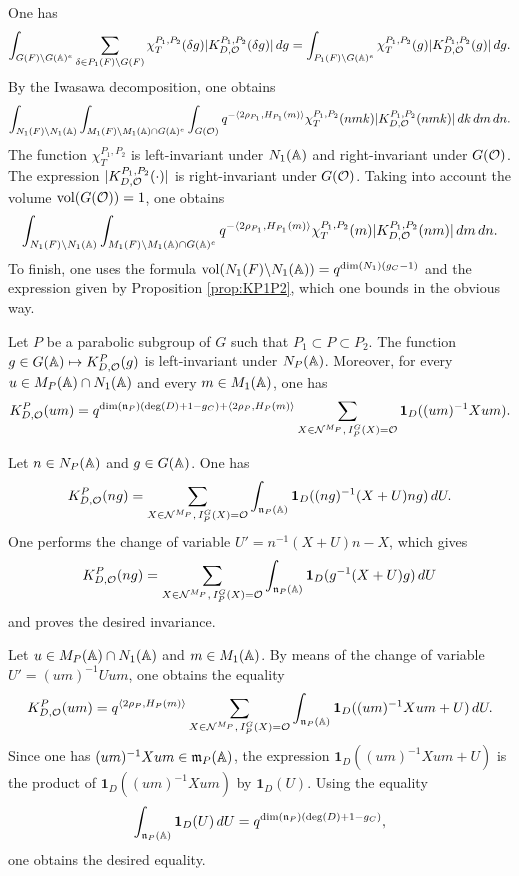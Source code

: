 \begin{paragr}
\begin{preuve}
  One has
$$\int_{G(F)\backslash G(\mathbb{A})^e} \sum_{\delta\in P_1(F)\backslash G(F)} \chi_T^{P_1,P_2}(\delta g)|K^{P_1,P_2}_{D,\mathcal{O}}(\delta g)|\, dg=\int_{P_1(F)\backslash G(\mathbb{A})^e} \chi_T^{P_1,P_2}(g)|K^{P_1,P_2}_{D,\mathcal{O}}(g)|\, dg.$$
By the Iwasawa decomposition, one obtains
$$\int_{N_1(F)\backslash N_1(\mathbb{A})} \int_{M_1(F)\backslash M_1(\mathbb{A})\cap G(\mathbb{A})^e} \int_{G(\mathcal{O})} q^{-\langle 2\rho_{P_1},H_{P_1}(m)\rangle} \chi_T^{P_1,P_2}(nmk)|K^{P_1,P_2}_{D,\mathcal{O}}(nmk)|\, dk\, dm\, dn.$$
The function $\chi_T^{P_1,P_2}$ is left-invariant under $N_1(\mathbb{A})$ and right-invariant under $G(\mathcal{O})$. The expression $|K^{P_1,P_2}_{D,\mathcal{O}}(\cdot)|$ is right-invariant under $G(\mathcal{O})$. Taking into account the volume $\operatorname{vol}(G(\mathcal{O}))=1$, one obtains
$$\int_{N_1(F)\backslash N_1(\mathbb{A})} \int_{M_1(F)\backslash M_1(\mathbb{A})\cap G(\mathbb{A})^e} q^{-\langle 2\rho_{P_1},H_{P_1}(m)\rangle} \chi_T^{P_1,P_2}(m)|K^{P_1,P_2}_{D,\mathcal{O}}(nm)|\, dm\, dn.$$
To finish, one uses the formula $\operatorname{vol}(N_1(F)\backslash N_1(\mathbb{A}))=q^{\dim(N_1)(g_C-1)}$ and the expression given by Proposition \ref{prop:KP1P2}, which one bounds in the obvious way.
\end{preuve}

\begin{lemme}\label{lem:invariance-KP}
  Let $P$ be a parabolic subgroup of $G$ such that $P_1\subset P\subset P_2$. The function $g\in G(\mathbb{A})\mapsto K^P_{D,\mathcal{O}}(g)$ is left-invariant under $N_P(\mathbb{A})$. Moreover, for every $u\in M_P(\mathbb{A})\cap N_1(\mathbb{A})$ and every $m\in M_1(\mathbb{A})$, one has
$$K^P_{D,\mathcal{O}}(um)= q^{\dim(\mathfrak{n}_P)(\deg(D)+1-g_C)+\langle 2\rho_P,H_P(m)\rangle} \sum_{X\in \mathcal{N}^{M_P},\, I_P^G(X)=\mathcal{O}} \mathbf{1}_D((um)^{-1}Xum).$$
\end{lemme}

\begin{preuve}
  Let $n\in N_P(\mathbb{A})$ and $g\in G(\mathbb{A})$. One has
$$K^P_{D,\mathcal{O}}(ng)=\sum_{X\in \mathcal{N}^{M_P},\, I_P^G(X)=\mathcal{O}} \int_{\mathfrak{n}_P(\mathbb{A})} \mathbf{1}_D((ng)^{-1}(X+U)ng)\, dU.$$
One performs the change of variable $U'=n^{-1}(X+U)n-X$, which gives
$$K^P_{D,\mathcal{O}}(ng)=\sum_{X\in \mathcal{N}^{M_P},\, I_P^G(X)=\mathcal{O}} \int_{\mathfrak{n}_P(\mathbb{A})} \mathbf{1}_D(g^{-1}(X+U)g)\, dU$$
and proves the desired invariance.

Let $u\in M_P(\mathbb{A})\cap N_1(\mathbb{A})$ and $m\in M_1(\mathbb{A})$. By means of the change of variable $U'=(um)^{-1}Uum$, one obtains the equality
$$K^P_{D,\mathcal{O}}(um)= q^{\langle 2\rho_P,H_P(m)\rangle} \sum_{X\in \mathcal{N}^{M_P},\, I_P^G(X)=\mathcal{O}} \int_{\mathfrak{n}_P(\mathbb{A})} \mathbf{1}_D((um)^{-1}Xum+U)\, dU.$$
Since one has $(um)^{-1}Xum\in \mathfrak{m}_P(\mathbb{A})$, the expression $\mathbf{1}_D((um)^{-1}Xum+U)$ is the product of $\mathbf{1}_D((um)^{-1}Xum)$ by $\mathbf{1}_D(U)$. Using the equality
$$\int_{\mathfrak{n}_P(\mathbb{A})} \mathbf{1}_D(U)\, dU= q^{\dim(\mathfrak{n}_P)(\deg(D)+1-g_C)},$$
one obtains the desired equality.
\end{preuve}


\end{paragr}
